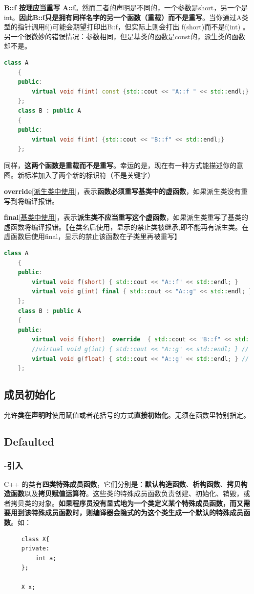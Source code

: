 \documentclass[UTF8,a4paper,12pt]{ctexbook} %
\begin{document}
			\textbf{B::f 按理应当重写 A::f}。然而二者的声明是不同的，一个参数是short，另一个是int。\textbf{因此B::f只是拥有同样名字的另一个函数（重载）而不是重写}。当你通过A类型的指针调用f()可能会期望打印出B::f，但实际上则会打出 f(short)而不是f(int) 。另一个很微妙的错误情况：参数相同，但是基类的函数是const的，派生类的函数却不是。
			\begin{lstlisting}[language= C++]
	class A 
	{
	public:
		virtual void f(int) const {std::cout << "A::f " << std::endl;}
	};
	class B : public A
	{
	public:
		virtual void f(int) {std::cout << "B::f" << std::endl;}
	};			
			\end{lstlisting}
			
			
			同样，\textbf{这两个函数是重载而不是重写}。幸运的是，现在有一种方式能描述你的意图。新标准加入了两个新的标识符（不是关键字）
			
			\textbf{override}[\underline{派生类中使用}]，表示\textbf{函数必须重写基类中的虚函数}，如果派生类没有重写到将编译报错。
			
			\textbf{final}[\underline{基类中使用}]，表示\textbf{派生类不应当重写这个虚函数}，如果派生类重写了基类的虚函数将编译报错。【在类名后使用，显示的禁止类被继承,即不能再有派生类。在虚函数后使用final，显示的禁止该函数在子类里再被重写】
			
			\begin{lstlisting}[language=C++]
	class A
	{
	public:
		virtual void f(short) { std::cout << "A::f" << std::endl; }
		virtual void g(int) final { std::cout << "A::g" << std::endl; }
	};
	class B : public A
	{
	public:
		virtual void f(short)  override  { std::cout << "B::f" << std::endl; }
		//virtual void g(int) { std::cout << "A::g" << std::endl; } // error C3248: "main::A::g":  final'func can not be "main::B::g" Rewrite: Wu fa Bei ChongXie
		virtual void g(float) { std::cout << "A::g" << std::endl; } // ChongZai
	};			
			\end{lstlisting}
		\subsection{成员初始化}
			允许\textbf{类在声明时}使用赋值或者花括号的方式\textbf{直接初始化}。无须在函数里特别指定。	
		\subsection{Defaulted}	
			\subsubsection{-引入}
				C++ 的类有\textbf{四类特殊成员函数}，它们分别是：\textbf{默认构造函数}、\textbf{析构函数}、\textbf{拷贝构造函数}以及\textbf{拷贝赋值运算符}。这些类的特殊成员函数负责创建、初始化、销毁，或者拷贝类的对象。\textbf{如果程序员没有显式地为一个类定义某个特殊成员函数，而又需要用到该特殊成员函数时，则编译器会隐式的为这个类生成一个默认的特殊成员函数}。如：
					\begin{lstlisting}
	 class X{ 
	 private: 
		 int a; 
	 }; 
	 
	 X x;					
					\end{lstlisting}
					
\end{document}
